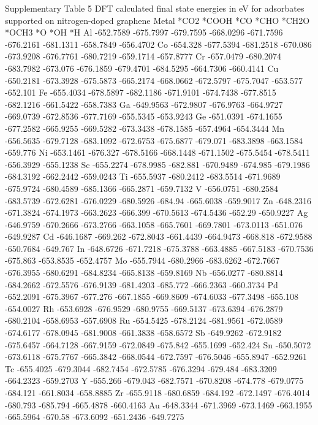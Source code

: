 Supplementary Table 5
DFT calculated final state energies in eV for adsorbates supported on nitrogen-doped graphene
Metal	*CO2	*COOH	*CO	*CHO	*CH2O	*OCH3	*O	*OH	*H
Al	-652.7589	-675.7997	-679.7595	-668.0296	-671.7596	-676.2161	-681.1311	-658.7849	-656.4702
Co	-654.328	-677.5394	-681.2518	-670.086	-673.9208	-676.7761	-680.7219	-659.1714	-657.8777
Cr	-657.0479	-680.2074	-683.7982	-673.076	-676.1859	-679.4701	-684.5295	-664.7306	-660.4141
Cu	-650.2181	-673.3928	-675.5873	-665.2174	-668.0662	-672.5797	-675.7047	-653.577	-652.101
Fe	-655.4034	-678.5897	-682.1186	-671.9101	-674.7438	-677.8515	-682.1216	-661.5422	-658.7383
Ga	-649.9563	-672.9807	-676.9763	-664.9727	-669.0739	-672.8536	-677.7169	-655.5345	-653.9243
Ge	-651.0391	-674.1655	-677.2582	-665.9255	-669.5282	-673.3438	-678.1585	-657.4964	-654.3444
Mn	-656.5635	-679.7128	-683.1092	-672.6753	-675.6877	-679.071	-683.3898	-663.1584	-659.776
Ni	-653.1461	-676.327	-678.5166	-668.1448	-671.1502	-675.5454	-678.5411	-656.3929	-655.1238
Sc	-655.2274	-678.9985	-682.881	-670.9489	-674.985	-679.1986	-684.3192	-662.2442	-659.0243
Ti	-655.5937	-680.2412	-683.5514	-671.9689	-675.9724	-680.4589	-685.1366	-665.2871	-659.7132
V	-656.0751	-680.2584	-683.5739	-672.6281	-676.0229	-680.5926	-684.94		-665.6038	-659.9017
Zn	-648.2316	-671.3824	-674.1973	-663.2623	-666.399	-670.5613	-674.5436	-652.29	-650.9227
Ag	-646.9759	-670.2666	-673.2766	-663.1058	-665.7601	-669.7801	-673.0113	-651.076	-649.9287
Cd	-646.1687	-669.262	-672.8043	-661.4439	-664.9473	-668.818	-672.9588	-650.7684	-649.767
In	-648.6726	-671.7218	-675.3788	-663.4885	-667.5183	-670.7536	-675.863	-653.8535	-652.4757
Mo	-655.7944	-680.2966	-683.6262	-672.7667	-676.3955	-680.6291	-684.8234	-665.8138	-659.8169
Nb	-656.0277	-680.8814	-684.2662	-672.5576	-676.9139	-681.4203	-685.772	-666.2363	-660.3734
Pd	-652.2091	-675.3967	-677.276	-667.1855	-669.8609	-674.6033	-677.3498	-655.108	-654.0027
Rh	-653.6928	-676.9529	-680.9755	-669.5137	-673.6394	-676.2879	-680.2104	-658.6953	-657.6908
Ru	-654.5425	-678.2124	-681.9561	-672.0589	-674.6177	-678.0945	-681.9008	-661.3838	-658.6572
Sb	-649.9262	-672.9182	-675.6457	-664.7128	-667.9159	-672.0849	-675.842	-655.1699	-652.424
Sn	-650.5072	-673.6118	-675.7767	-665.3842	-668.0544	-672.7597	-676.5046	-655.8947	-652.9261
Tc	-655.4025	-679.3044	-682.7454	-672.5785	-676.3294	-679.484	-683.3209	-664.2323	-659.2703
Y	-655.266	-679.043	-682.7571	-670.8208	-674.778	-679.0775	-684.121	-661.8034	-658.8885
Zr	-655.9118	-680.6859	-684.192	-672.1497	-676.4014	-680.793	-685.794	-665.4878	-660.4163
Au	-648.3344	-671.3969	-673.1469	-663.1955	-665.5964	-670.58		-673.6092	-651.2436	-649.7275
